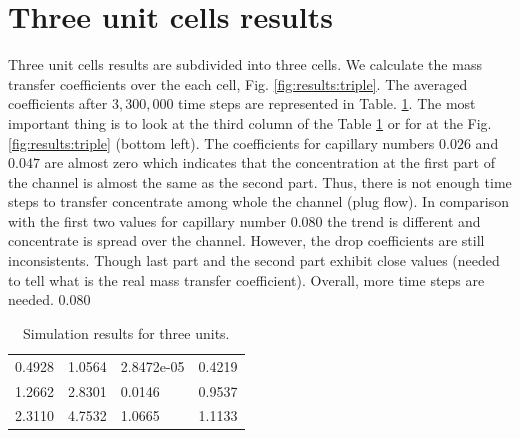 \documentclass{article}
\begin{document}
\section{Three unit cells results}
Three unit cells results are subdivided into three cells. We calculate the mass transfer
coefficients over the each cell, Fig. \ref{fig:results:triple}. The averaged coefficients  after
$3,300,000$ time steps are represented in Table. \ref{table:three_units}. The most important thing
is to look at the third column of the Table \ref{table:three_units} or for at the Fig.
\ref{fig:results:triple} (bottom left). The coefficients for capillary numbers $0.026$ and $0.047$
are almost zero which indicates that the concentration at the first part of the channel is almost
the same as the second part. Thus, there is not enough time steps to transfer concentrate among
whole the channel (plug flow). In comparison with the first two values for capillary number $0.080$
the trend is different and concentrate is spread over the channel. However, the drop coefficients
are still inconsistents. Though last part and the second part exhibit close values (needed to tell
what is the real mass transfer coefficient). Overall, more time steps are needed.
$0.080$
\begin{table}[htb!]
\begin{tabularx}{\textwidth}{|X|X|X|X|}
\hline
0.4928&1.0564&2.8472e-05&0.4219\\
1.2662&2.8301&0.0146&0.9537\\
2.3110&4.7532&1.0665&1.1133\\
\hline
\end{tabularx}
\caption{Simulation results for three units.\label{table:three_units}}
\end{table}
\end{document}
